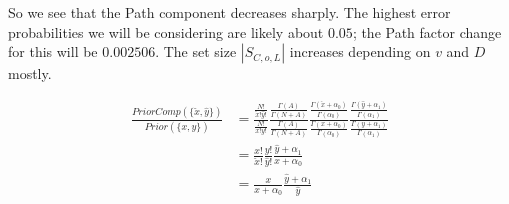 \documentclass{article}
\begin{document}
So we see that the Path component decreases sharply.  The highest
error probabilities we will be considering are likely about $0.05$;
the Path factor change for this will be $0.002506$. The set size
$|S_{C,o,L}|$ increases depending on $v$ and $D$ mostly.


\begin{align}
  \frac{PriorComp(\{\check{x},\hat{y}\})}{Prior(\{x,y\})} & =
  \frac{\frac{N!}{\check{x}!\hat{y}!}}{\frac{N!}{x!y!}}
  \frac{\frac{\Gamma(A)}{\Gamma(N+A)}}{\frac{\Gamma(A)}{\Gamma(N+A)}}
  \frac{ \frac{\Gamma(\check{x}+\alpha_0)}{\Gamma(\alpha_0)} }{
    \frac{\Gamma(x+\alpha_0)}{\Gamma(\alpha_0)} } \frac{
    \frac{\Gamma(\hat{y}+\alpha_1)}{\Gamma(\alpha_1)} }{
    \frac{\Gamma(y+\alpha_1)}{\Gamma(\alpha_1)} } \nonumber \\[2ex] &
  = \frac{x!}{\check{x}!}  \frac{y!}{\hat{y}!}
  \frac{\hat{y}+\alpha_1}{x+\alpha_0} \nonumber \\ & =
  \frac{x}{x+\alpha_0} \frac{\hat{y}+\alpha_1}{\hat{y}}
\end{align}
\end{document}
